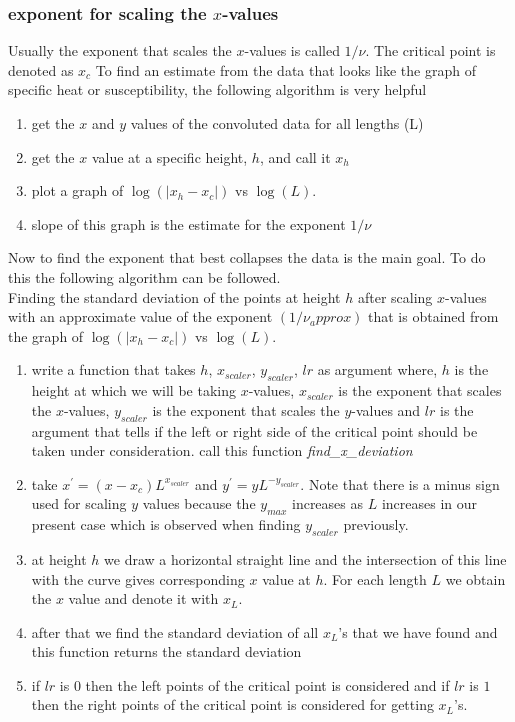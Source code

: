 		\subsubsection{exponent for scaling the $x$-values}
		Usually the exponent that scales the $x$-values is called $1/\nu$. The critical point is denoted as $x_c$
		To find an estimate from the data that looks like the graph of specific heat or susceptibility, the following algorithm is very helpful
		\begin{enumerate}
			\item get the $x$ and $y$ values of the convoluted data for all lengths (L)
			\item get the $x$ value at a specific height, $h$, and call it $x_h$
			\item plot a graph of $\log( \left|x_h - x_c\right| )$ vs $\log(L)$.
			\item slope of this graph is the estimate for the exponent $1/\nu$
		\end{enumerate}
		Now to find the exponent that best collapses the data is the main goal. To do this the following algorithm can be followed.\\
		Finding the standard deviation of the points at height $h$ after scaling $x$-values with an approximate value of the exponent $(1/\nu{_approx})$ that is obtained from the graph of $\log( \left|x_h - x_c\right| )$ vs $\log(L)$.
		\begin{enumerate}
			\item write a function that takes $h$, $x_{scaler}$, $y_{scaler}$, $lr$ as argument where, $h$ is the height at which we will be taking $x$-values, $x_{scaler}$ is the exponent that scales the $x$-values, $y_{scaler}$ is the exponent that scales the $y$-values and $lr$ is the argument that tells if the left or right side of the critical point should be taken under consideration. call this function \textit{find\_x\_deviation}
			
			
			\item take $x^\prime = (x-x_c) L^{x_{scaler}}$ and $y^\prime = y L^{-y_{scaler}}$. Note that there is a minus sign used for scaling $y$ values because the $y_{max}$ increases as $L$ increases in our present case which is observed when finding $y_{scaler}$ previously.
			
			
			\item at height $h$ we draw a horizontal straight line and the intersection of this line with the curve gives corresponding $x$ value at $h$. For each length $L$ we obtain the $x$ value and denote it with $x_L$.
			
			\item after that we find the standard deviation of all $x_L$'s that we have found and this function returns the standard deviation
			
			\item if $lr$ is $0$ then the left points of the critical point is considered and if $lr$ is $1$ then the right points of the critical point is considered for getting $x_L$'s.
		\end{enumerate}
